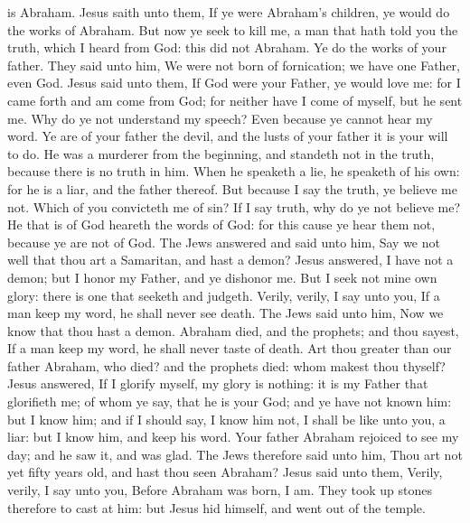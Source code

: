is Abraham. Jesus saith unto them, If ye were Abraham’s children, ye would do the works of Abraham. But now ye seek to kill me, a man that hath told you the truth, which I heard from God: this did not Abraham. Ye do the works of your father. They said unto him, We were not born of fornication; we have one Father, even God. Jesus said unto them, If God were your Father, ye would love me: for I came forth and am come from God; for neither have I come of myself, but he sent me. Why do ye not understand my speech? Even because ye cannot hear my word. Ye are of your father the devil, and the lusts of your father it is your will to do. He was a murderer from the beginning, and standeth not in the truth, because there is no truth in him. When he speaketh a lie, he speaketh of his own: for he is a liar, and the father thereof. But because I say the truth, ye believe me not. Which of you convicteth me of sin? If I say truth, why do ye not believe me? He that is of God heareth the words of God: for this cause ye hear them not, because ye are not of God. The Jews answered and said unto him, Say we not well that thou art a Samaritan, and hast a demon? Jesus answered, I have not a demon; but I honor my Father, and ye dishonor me. But I seek not mine own glory: there is one that seeketh and judgeth. Verily, verily, I say unto you, If a man keep my word, he shall never see death. The Jews said unto him, Now we know that thou hast a demon. Abraham died, and the prophets; and thou sayest, If a man keep my word, he shall never taste of death. Art thou greater than our father Abraham, who died? and the prophets died: whom makest thou thyself? Jesus answered, If I glorify myself, my glory is nothing: it is my Father that glorifieth me; of whom ye say, that he is your God; and ye have not known him: but I know him; and if I should say, I know him not, I shall be like unto you, a liar: but I know him, and keep his word. Your father Abraham rejoiced to see my day; and he saw it, and was glad. The Jews therefore said unto him, Thou art not yet fifty years old, and hast thou seen Abraham? Jesus said unto them, Verily, verily, I say unto you, Before Abraham was born, I am. They took up stones therefore to cast at him: but Jesus hid himself, and went out of the temple. 

